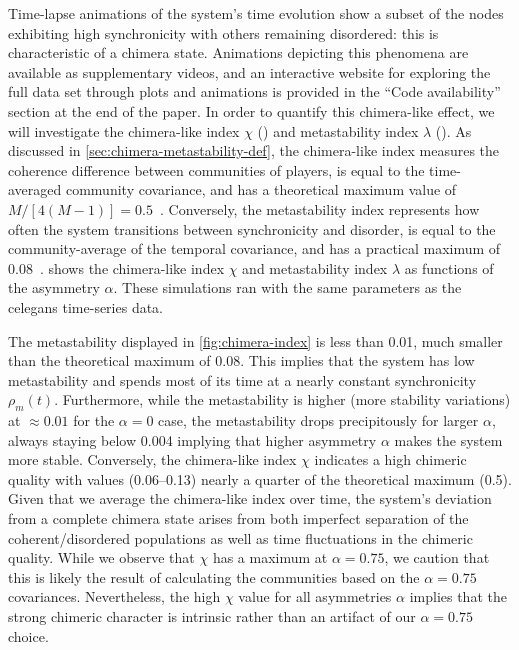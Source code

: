 \documentclass[pdflatex,lineno,referee,sn-nature]{sn-jnl}
\begin{document}
Time-lapse animations of the system's time evolution
show a subset of the nodes exhibiting high synchronicity
with others remaining disordered: this is characteristic of a chimera state.
Animations depicting this phenomena are available as supplementary videos,
and an interactive website for exploring the full data set
through plots and animations is provided in the ``Code availability''
section at the end of the paper.
In order to quantify this chimera-like effect, we will investigate
the chimera-like index $\chi$ ()
and metastability index $\lambda$ ().
As discussed in \cref{sec:chimera-metastability-def},
the chimera-like index
measures the coherence difference between communities of players,
is equal to the time-averaged community covariance,
and has a theoretical maximum value
of $M/[4(M-1)] = \num{0.5}$~\citep{shanahan2010metastable}.
Conversely, the metastability index
represents how often the system transitions
between synchronicity and disorder,
is equal to the community-average of the temporal covariance,
and has a practical maximum of \num{0.08}~\citep{shanahan2010metastable}.
 shows the
 chimera-like index $\chi$
and
 metastability index $\lambda$
as functions of the asymmetry $\alpha$.
These simulations ran with the same parameters as the
\gls{celegans} time-series data.

The metastability displayed in \cref{fig:chimera-index}
is less than \num{0.01}, much smaller
than the theoretical maximum of \num{0.08}.
This implies that the system has low metastability
and spends most of its time at a nearly constant
synchronicity $\rho_m(t)$.
Furthermore, while the metastability is higher (more stability variations)
at $\approx \num{0.01}$ for the $\alpha = 0$ case,
the metastability drops precipitously for larger $\alpha$,
always staying below \num{0.004} implying that
higher asymmetry $\alpha$ makes the system more stable.
Conversely, the chimera-like index $\chi$
indicates a high chimeric quality
with values (\numrange{0.06}{0.13})
nearly a quarter of the theoretical maximum (\num{0.5}).
Given that we average the chimera-like index over time,
the system's deviation from a complete chimera state
arises from both imperfect separation of the coherent/disordered populations
as well as time fluctuations in the chimeric quality.
While we observe that $\chi$ has a maximum at $\alpha = \num{0.75}$,
we caution that this is likely the result of calculating the communities
based on the $\alpha = \num{0.75}$ covariances.
Nevertheless, the high $\chi$ value for all asymmetries $\alpha$
implies that the strong chimeric character is intrinsic
rather than an artifact of our $\alpha = \num{0.75}$ choice.
\end{document}
